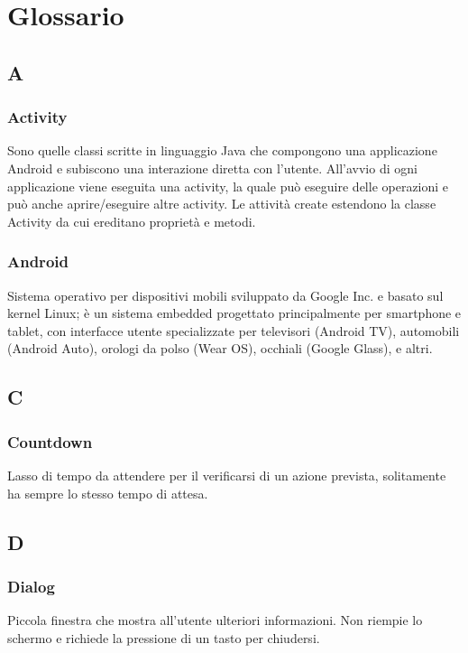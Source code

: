 \section{Glossario}
\subsection*{A}
\subsubsection*{Activity}
Sono quelle classi scritte in linguaggio Java che compongono una applicazione Android e subiscono
una interazione diretta con l'utente. All'avvio di ogni applicazione viene eseguita una activity, la
quale può eseguire delle operazioni e può anche aprire/eseguire altre activity. Le attività create
estendono la classe Activity da cui ereditano proprietà e metodi.

\subsubsection*{Android}
Sistema operativo per dispositivi mobili sviluppato da Google Inc. e basato sul kernel Linux; è
un sistema embedded progettato principalmente per smartphone e tablet, con interfacce utente
specializzate per televisori (Android TV), automobili (Android Auto), orologi da polso (Wear
OS), occhiali (Google Glass), e altri.

\subsection*{C}
\subsubsection*{Countdown}
Lasso di tempo da attendere per il verificarsi di un azione prevista, solitamente ha sempre lo stesso tempo di attesa.

\subsection*{D}
\subsubsection*{Dialog}
Piccola finestra che mostra all'utente ulteriori informazioni. Non riempie lo schermo e richiede la pressione di un tasto per chiudersi.

